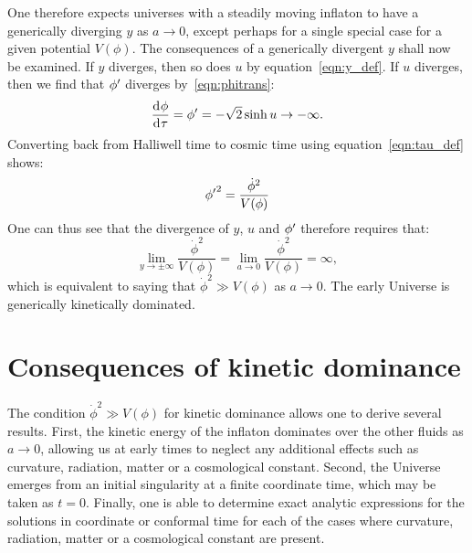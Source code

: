 One therefore expects universes with a steadily moving inflaton to have a generically diverging $y$ as $a\to0$, except perhaps for a single special case for a given potential $V(\phi)$.  The consequences of a generically divergent $y$ shall now be examined.  If $y$ diverges, then so does $u$ by equation~\eqref{eqn:y_def}. If $u$ diverges, then we find that ${{\phi}^\prime}$ diverges by~\eqref{eqn:phitrans}:
%
\begin{equation}
  \frac{\operatorname{d}^{}\!{\phi}}{\operatorname{d}^{}\!{\tau}}={{\phi}^\prime} 
  = 
  -\sqrt{2}\sinh u\rightarrow -\infty.
\end{equation}
%
Converting back from Halliwell time to cosmic time using equation~\eqref{eqn:tau_def} shows:
%
\begin{equation}
  {{\phi}^\prime}^2 
  = 
  \frac{\dot{\phi}^2}{V(\phi)}
\end{equation}
%
One can thus see that the divergence of $y$, $u$ and ${{\phi}^\prime}$ therefore requires that:
%
\begin{equation}
  \lim\limits_{y\to\pm\infty} \frac{\dot\phi^2}{V(\phi)}
  =
  \lim\limits_{a\to 0} \frac{\dot\phi^2}{V(\phi)} = \infty,
  \label{eqn:kdfinal}
\end{equation}
%
which is equivalent to saying that $\dot{\phi}^2\gg V(\phi)$ as
$a\to0$. The early Universe is generically kinetically dominated.

\section{Consequences of kinetic dominance}
\label{sec:consequences_of_kinetic_dominance}

The condition $\dot\phi^2\gg V(\phi)$ for kinetic dominance allows one to derive several results. First, the kinetic energy of the inflaton dominates over the other fluids as $a\to 0$, allowing us at early times to neglect any additional effects such as curvature, radiation, matter or a cosmological constant. Second, the Universe emerges from an initial singularity at a finite coordinate time, which may be taken as $t=0$. Finally, one is able to determine exact analytic expressions for the solutions in coordinate or conformal time for each of the cases where curvature, radiation, matter or a cosmological constant are present.


